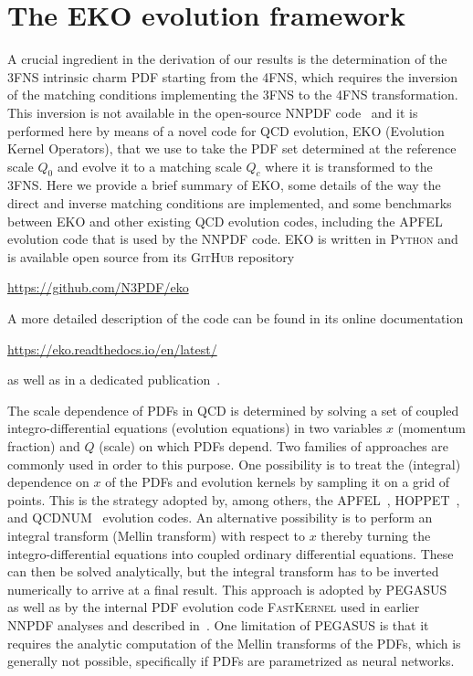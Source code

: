 
\section{The EKO evolution framework}
\label{app:ic/eko}

A crucial ingredient in the derivation of our results
is the determination of the 3FNS intrinsic
charm PDF starting from the 4FNS, which requires the inversion of the matching
conditions implementing the 3FNS to 
the 4FNS transformation.
%
This inversion is not available in the open-source NNPDF
code~\cite{NNPDF:2021uiq} and it is performed here by means of a novel code
for QCD evolution, 
 \textsc{\small EKO} (Evolution Kernel Operators), that we use to take the
 PDF set determined at the reference scale $Q_0$ and evolve it to a
 matching scale $Q_c$ where it is transformed to the 3FNS.
%
Here we provide a brief summary of \textsc{\small
EKO}, some details of the way the direct and inverse matching
conditions are implemented, and some benchmarks between \textsc{\small
EKO} and other existing QCD evolution codes, including the  \textsc{\small
APFEL}~\cite{Bertone:2013vaa} evolution code that is used by the
NNPDF code.
\textsc{\small EKO} is written in \textsc{\small Python} and is available
open source from its \textsc{\small GitHub} repository
\begin{center}
\url{https://github.com/N3PDF/eko}
\end{center}
A more detailed description of the code can be found
in its online documentation
\begin{center}
\url{https://eko.readthedocs.io/en/latest/}
\end{center}
as well as in a dedicated publication~\cite{Candido:2022tld}.

The scale dependence of PDFs in QCD is determined by solving a set
of coupled integro-differential equations (evolution equations) in two
variables $x$ (momentum fraction) and $Q$ (scale) on which PDFs depend.
Two families of approaches are commonly used in order to this purpose.
%
One possibility is to treat the (integral) dependence on $x$ of the
PDFs and evolution kernels by
sampling it on a grid of points.
%
This is the strategy adopted by, among others, the  \textsc{\small APFEL}~\cite{Bertone:2013vaa},
\textsc{\small HOPPET}~\cite{Salam:2008qg},
and \textsc{\small QCDNUM}~\cite{Botje:2010ay} evolution codes.
%
An alternative possibility is to perform an integral transform (Mellin
transform) with
respect to $x$ thereby turning the integro-differential equations into
coupled ordinary differential equations. These can then be solved
analytically, but the integral transform has to be inverted numerically
to arrive at a final result.
%
This approach is adopted by \textsc{\small PEGASUS}~\cite{pegasus} as well as by the
internal PDF evolution code \textsc{\small FastKernel} used in earlier NNPDF analyses
and described in~\cite{DelDebbio:2007ee,Ball:2008by,Ball:2010de}.
%
One limitation of \textsc{\small PEGASUS} is that it requires the analytic
computation of the Mellin transforms of
the PDFs, which is generally not possible, specifically if PDFs are
parametrized as neural networks.
%

